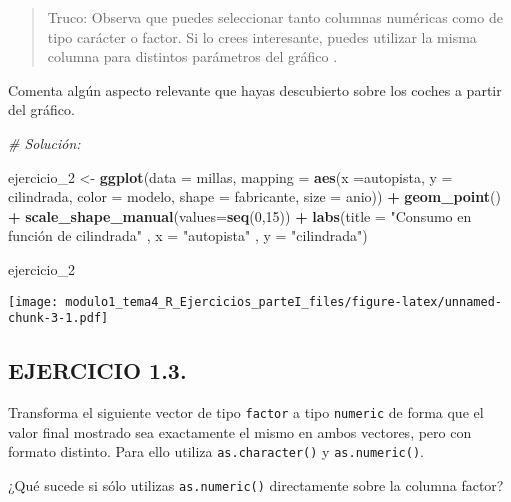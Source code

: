 \documentclass[]{article}
\newenvironment{Shaded}{\begin{snugshade}}{\end{snugshade}}
\newcommand{\CommentTok}[1]{\textcolor[rgb]{0.56,0.35,0.01}{\textit{#1}}}
\newcommand{\DataTypeTok}[1]{\textcolor[rgb]{0.13,0.29,0.53}{#1}}
\newcommand{\DecValTok}[1]{\textcolor[rgb]{0.00,0.00,0.81}{#1}}
\newcommand{\KeywordTok}[1]{\textcolor[rgb]{0.13,0.29,0.53}{\textbf{#1}}}
\newcommand{\NormalTok}[1]{#1}
\newcommand{\OperatorTok}[1]{\textcolor[rgb]{0.81,0.36,0.00}{\textbf{#1}}}
\newcommand{\StringTok}[1]{\textcolor[rgb]{0.31,0.60,0.02}{#1}}
\begin{document}
\begin{quote}
Truco: Observa que puedes seleccionar tanto columnas numéricas como de
tipo carácter o factor. Si lo crees interesante, puedes utilizar la
misma columna para distintos parámetros del gráfico .
\end{quote}

Comenta algún aspecto relevante que hayas descubierto sobre los coches a
partir del gráfico.

\begin{Shaded}
\begin{Highlighting}[]
\CommentTok{# Solución:}

\NormalTok{ejercicio_}\DecValTok{2}\NormalTok{ <-}\StringTok{ }\KeywordTok{ggplot}\NormalTok{(}\DataTypeTok{data =}\NormalTok{ millas, }\DataTypeTok{mapping =} \KeywordTok{aes}\NormalTok{(}\DataTypeTok{x =}\NormalTok{autopista, }\DataTypeTok{y =}\NormalTok{ cilindrada, }\DataTypeTok{color =}\NormalTok{ modelo, }\DataTypeTok{shape =}\NormalTok{ fabricante, }\DataTypeTok{size =}\NormalTok{ anio)) }\OperatorTok{+}\StringTok{ }
\StringTok{  }\KeywordTok{geom_point}\NormalTok{() }\OperatorTok{+}
\StringTok{  }\KeywordTok{scale_shape_manual}\NormalTok{(}\DataTypeTok{values=}\KeywordTok{seq}\NormalTok{(}\DecValTok{0}\NormalTok{,}\DecValTok{15}\NormalTok{)) }\OperatorTok{+}
\StringTok{  }\KeywordTok{labs}\NormalTok{(}\DataTypeTok{title =} \StringTok{"Consumo en función de cilindrada"}
\NormalTok{       , }\DataTypeTok{x =} \StringTok{"autopista"}
\NormalTok{       , }\DataTypeTok{y =} \StringTok{"cilindrada"}\NormalTok{)}

\NormalTok{ejercicio_}\DecValTok{2}
\end{Highlighting}
\end{Shaded}

\texttt{[image: modulo1\_tema4\_R\_Ejercicios\_parteI\_files/figure-latex/unnamed-chunk-3-1.pdf]}

\hypertarget{ejercicio-1.3.}{%
\subsection{EJERCICIO 1.3.}\label{ejercicio-1.3.}}

Transforma el siguiente vector de tipo \texttt{factor} a tipo
\texttt{numeric} de forma que el valor final mostrado sea exactamente el
mismo en ambos vectores, pero con formato distinto. Para ello utiliza
\texttt{as.character()} y \texttt{as.numeric()}.

¿Qué sucede si sólo utilizas \texttt{as.numeric()} directamente sobre la
columna factor?
\end{document}
